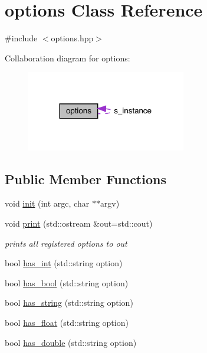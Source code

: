 \hypertarget{classoptions}{}\section{options Class Reference}
\label{classoptions}


{\ttfamily \#include $<$options.\+hpp$>$}



Collaboration diagram for options\+:\nopagebreak
\begin{figure}[H]
\begin{center}
\leavevmode
\includegraphics[width=197pt]{classoptions__coll__graph}
\end{center}
\end{figure}
\subsection*{Public Member Functions}
\begin{DoxyCompactItemize}
\item 
void \hyperlink{classoptions_a6d909eacd89dee5f0b153430985f9822}{init} (int argc, char $\ast$$\ast$argv)
\item 
void \hyperlink{classoptions_a6fd8a97883eaecb722e5c6b120d8f9be}{print} (std\+::ostream \&out=std\+::cout)
\begin{DoxyCompactList}\small\item\em prints all registered options to \textquotesingle{}out\textquotesingle{} \end{DoxyCompactList}\end{DoxyCompactItemize}
\textbf{ }\par
\begin{DoxyCompactItemize}
\item 
bool \hyperlink{classoptions_a01020aa5bd82bcff1b1c950b20578883}{has\+\_\+int} (std\+::string option)
\item 
bool \hyperlink{classoptions_aafb1d2a7ccde0b1bf786230ba4080ecd}{has\+\_\+bool} (std\+::string option)
\item 
bool \hyperlink{classoptions_a5db5b27267c27ffe1b029948f64e54c1}{has\+\_\+string} (std\+::string option)
\item 
bool \hyperlink{classoptions_ae6f1f714c9ad1dc01cb5509df0c4c838}{has\+\_\+float} (std\+::string option)
\item 
bool \hyperlink{classoptions_ab66aae6c79cdde8dd38d0d3fc8aa3de5}{has\+\_\+double} (std\+::string option)
\end{DoxyCompactItemize}

